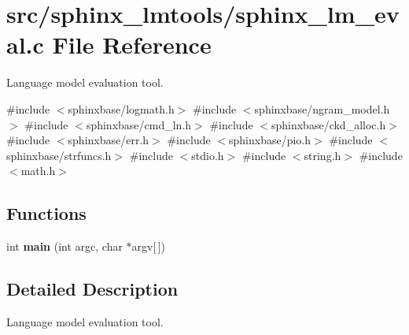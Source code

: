 \section{src/sphinx\+\_\+lmtools/sphinx\+\_\+lm\+\_\+eval.c File Reference}
\label{sphinx__lm__eval_8c}


Language model evaluation tool.  


{\ttfamily \#include $<$sphinxbase/logmath.\+h$>$}\newline
{\ttfamily \#include $<$sphinxbase/ngram\+\_\+model.\+h$>$}\newline
{\ttfamily \#include $<$sphinxbase/cmd\+\_\+ln.\+h$>$}\newline
{\ttfamily \#include $<$sphinxbase/ckd\+\_\+alloc.\+h$>$}\newline
{\ttfamily \#include $<$sphinxbase/err.\+h$>$}\newline
{\ttfamily \#include $<$sphinxbase/pio.\+h$>$}\newline
{\ttfamily \#include $<$sphinxbase/strfuncs.\+h$>$}\newline
{\ttfamily \#include $<$stdio.\+h$>$}\newline
{\ttfamily \#include $<$string.\+h$>$}\newline
{\ttfamily \#include $<$math.\+h$>$}\newline
\subsection*{Functions}
\begin{DoxyCompactItemize}
\item 
\mbox{\label{sphinx__lm__eval_8c_a0ddf1224851353fc92bfbff6f499fa97}} 
int {\bfseries main} (int argc, char $\ast$argv[$\,$])
\end{DoxyCompactItemize}


\subsection{Detailed Description}
Language model evaluation tool. 

